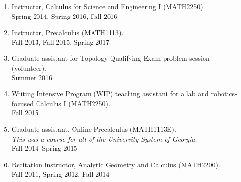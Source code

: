\documentclass[letterpaper]{article}
\renewenvironment{itemize}{
  \begin{list}{}{
    \setlength{\leftmargin}{1.5em}
  }
}{
  \end{list}
}
\begin{document}
\begin{enumerate}
\item Instructor, Calculus for Science and Engineering I (MATH2250). \\
  Spring 2014, Spring 2016, Fall 2016
\item Instructor, Precalculus (MATH1113). \\
  Fall 2013, Fall 2015, Spring 2017
\item Graduate assistant for Topology Qualifying Exam problem session
  (volunteer). \\
  Summer 2016
\item Writing Intensive Program (WIP) teaching assistant for a lab and
  robotics-focused Calculus I (MATH2250). \\
  Fall 2015
\item Graduate assistant, Online Precalculus (MATH1113E). \\
  \emph{This was a course for all of the University System of Georgia}.\\
  Fall 2014--Spring 2015
\item Recitation instructor, Analytic Geometry and Calculus
  (MATH2200).\\
  Fall 2011, Spring 2012, Fall 2014

\end{enumerate}
\end{document}
